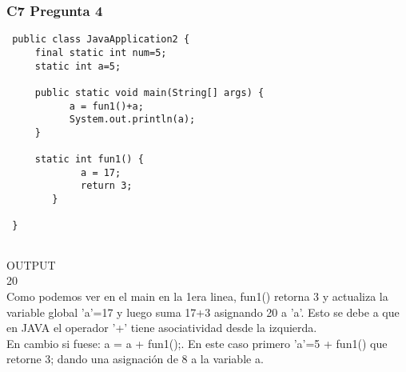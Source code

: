 \subsubsection{C7 Pregunta 4}
\begin{lstlisting}
 public class JavaApplication2 {
     final static int num=5;
     static int a=5;
    
     public static void main(String[] args) {          
           a = fun1()+a; 
           System.out.println(a); 
     }
 
     static int fun1() {
             a = 17;
             return 3;
        }
 
 }
 
 \end{lstlisting}
 OUTPUT\\
 20\\
 Como podemos ver en el main en la 1era linea, fun1() retorna 3 y actualiza la variable global 'a'=17 y luego suma 17+3 asignando 20 a 'a'. Esto se debe a que en JAVA el operador '+' tiene asociatividad desde la izquierda.\\
 En cambio si fuese:  a = a + fun1();. En este caso primero 'a'=5 + fun1() que retorne 3; dando una asignación de 8 a la variable a.